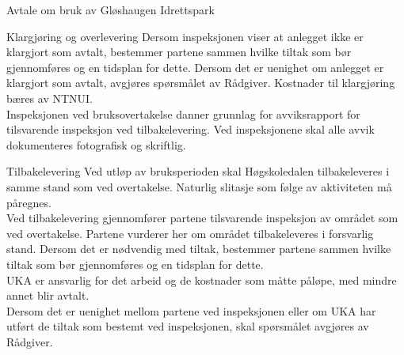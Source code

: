 \documentclass[../fsbok.tex]{subfiles}
\begin{document}
\begin{instruks*}{Avtale om bruk av Gløshaugen Idrettspark}
\begin{instruksledd}{Klargjøring og overlevering}
Dersom inspeksjonen viser at anlegget ikke er klargjort som avtalt, bestemmer partene sammen hvilke tiltak som bør gjennomføres og en tidsplan for dette. Dersom det er uenighet om anlegget er klargjort som avtalt, avgjøres spørsmålet av Rådgiver. Kostnader til klargjøring bæres av NTNUI.\\

Inspeksjonen ved bruksovertakelse danner grunnlag for avviksrapport for tilsvarende inspeksjon ved tilbakelevering.  Ved inspeksjonene skal alle avvik dokumenteres fotografisk og skriftlig.\\
\end{instruksledd}

\begin{instruksledd}{Tilbakelevering}
Ved utløp av bruksperioden skal Høgskoledalen tilbakeleveres i samme stand som ved overtakelse.  Naturlig slitasje som følge av aktiviteten må påregnes.\\  

Ved tilbakelevering gjennomfører partene tilsvarende inspeksjon av området som ved overtakelse.  Partene vurderer her om området tilbakeleveres i forsvarlig stand.  Dersom det er nødvendig med tiltak, bestemmer partene sammen hvilke tiltak som bør gjennomføres og en tidsplan for dette.\\  

UKA er ansvarlig for det arbeid og de kostnader som måtte påløpe, med mindre annet blir avtalt.\\ 

Dersom det er uenighet mellom partene ved inspeksjonen eller om UKA har utført de tiltak som bestemt ved inspeksjonen, skal spørsmålet avgjøres av Rådgiver.\\
\end{instruksledd}

\end{instruks*}
\end{document}
